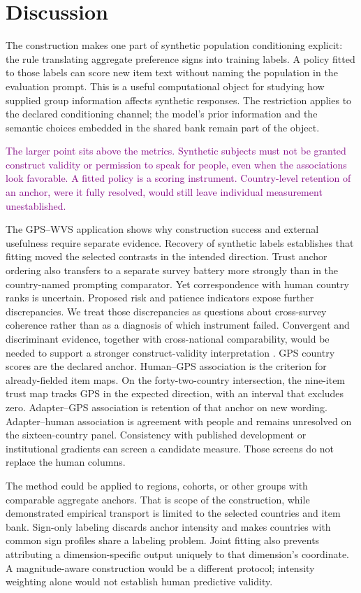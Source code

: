 \section{Discussion}\label{sec:discussion}
The construction makes one part of synthetic population conditioning explicit: the rule translating aggregate preference signs into training labels. A policy fitted to those labels can score new item text without naming the population in the evaluation prompt. This is a useful computational object for studying how supplied group information affects synthetic responses. The restriction applies to the declared conditioning channel; the model's prior information and the semantic choices embedded in the shared bank remain part of the object.

\textcolor{purple}{The larger point sits above the metrics. Synthetic subjects must not be granted construct validity or permission to speak for people, even when the associations look favorable. A fitted policy is a scoring instrument. Country-level retention of an anchor, were it fully resolved, would still leave individual measurement unestablished.}


The GPS--WVS application shows why construction success and external usefulness require separate evidence. Recovery of synthetic labels establishes that fitting moved the selected contrasts in the intended direction. Trust anchor ordering also transfers to a separate survey battery more strongly than in the country-named prompting comparator. Yet correspondence with human country ranks is uncertain. Proposed risk and patience indicators expose further discrepancies. We treat those discrepancies as questions about cross-survey coherence rather than as a diagnosis of which instrument failed. Convergent and discriminant evidence, together with cross-national comparability, would be needed to support a stronger construct-validity interpretation \cite{campbellfiske1959,davidov2014}. GPS country scores are the declared anchor. Human--GPS association is the criterion for already-fielded item maps. On the forty-two-country intersection, the nine-item trust map tracks GPS in the expected direction, with an interval that excludes zero. Adapter--GPS association is retention of that anchor on new wording. Adapter--human association is agreement with people and remains unresolved on the sixteen-country panel. Consistency with published development or institutional gradients can screen a candidate measure. Those screens do not replace the human columns.

The method could be applied to regions, cohorts, or other groups with comparable aggregate anchors. That is scope of the construction, while demonstrated empirical transport is limited to the selected countries and item bank. Sign-only labeling discards anchor intensity and makes countries with common sign profiles share a labeling problem. Joint fitting also prevents attributing a dimension-specific output uniquely to that dimension's coordinate. A magnitude-aware construction would be a different protocol; intensity weighting alone would not establish human predictive validity.

